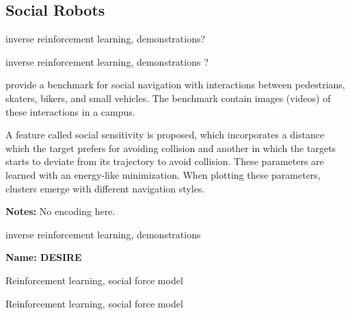 \subsection{Social Robots}\label{subsec: social robots}


\cite{vasquez2014inverse} inverse reinforcement learning, demonstrations?


\cite{okal2016learning} inverse reinforcement learning, demonstrations ?


\cite{robicquet2016learning} provide a benchmark for social navigation with interactions between pedestrians, skaters, bikers, and small vehicles. 
%
The benchmark contain images (videos) of these interactions in a campus.

A feature called social sensitivity is proposed, which incorporates a distance which the target prefers for avoiding collision and another in which the targets starts to deviate from its trajectory to avoid collision.
%
These parameters are learned with an energy-like minimization.
%
When plotting these parameters, clusters emerge with different navigation styles.

\textbf{Notes:} No encoding here. 


\cite{kretzschmar2016socially} inverse reinforcement learning, demonstrations


\textbf{Name: DESIRE}

\cite{lee2017desire}


\cite{chen2017decentralized} Reinforcement learning, social force model


\cite{chen2017socially} Reinforcement learning, social force model 

